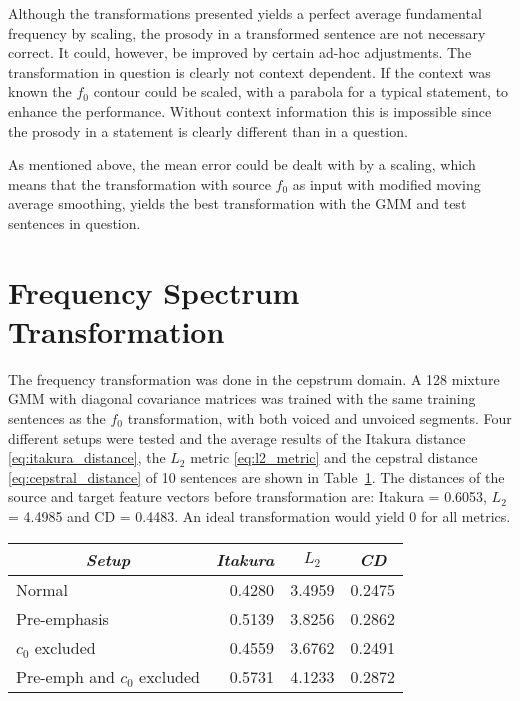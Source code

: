 Although the transformations presented yields a perfect average fundamental frequency by scaling, the prosody in a transformed sentence are not necessary correct. It could, however, be improved by certain ad-hoc adjustments. The transformation in question is clearly not context dependent. If the context was known the $f_0$ contour could be scaled, with \eg a parabola for a typical statement, to enhance the performance. Without context information this is impossible since the prosody in a statement is clearly different than in a question. 

As mentioned above, the mean error could be dealt with by a scaling, which means that the transformation with source $f_0$ as input with modified moving average smoothing, yields the best transformation with the GMM and test sentences in question.

\section{Frequency Spectrum Transformation} %
\label{sec:frequency_transformation}
The frequency transformation was done in the cepstrum domain. A 128 mixture GMM with diagonal covariance matrices was trained with the same training sentences as the $f_0$ transformation, with both voiced and unvoiced segments. Four different setups were tested and the average results of the Itakura distance \eqref{eq:itakura_distance}, the $L_2$ metric \eqref{eq:l2_metric} and the cepstral distance \eqref{eq:cepstral_distance} of 10 sentences are shown in Table~\ref{tab:absolute_freq_results}. The distances of the source and target feature vectors before transformation are: Itakura = 0.6053, $L_2$ = 4.4985 and CD = 0.4483. An ideal transformation would yield 0 for all metrics.
\begin{table}[htbp]
	\begin{center}
		\label{tab:absolute_freq_results}
		\begin{tabular}{lrrr}
			\toprule
			\multicolumn{1}{c}{\emph{Setup}} & \multicolumn{1}{c}{\emph{Itakura}} & \multicolumn{1}{c}{\emph{$L_2$}} & \multicolumn{1}{c}{\emph{CD}}\\
			\midrule
			Normal &  0.4280 & 3.4959 & 0.2475 \\
			Pre-emphasis & 0.5139 & 3.8256 & 0.2862 \\
			$c_0$ excluded & 0.4559 & 3.6762 & 0.2491 \\
			Pre-emph and $c_0$ excluded & 0.5731 & 4.1233 & 0.2872 \\
			\bottomrule			
		\end{tabular}		
	\end{center}	
\end{table}

